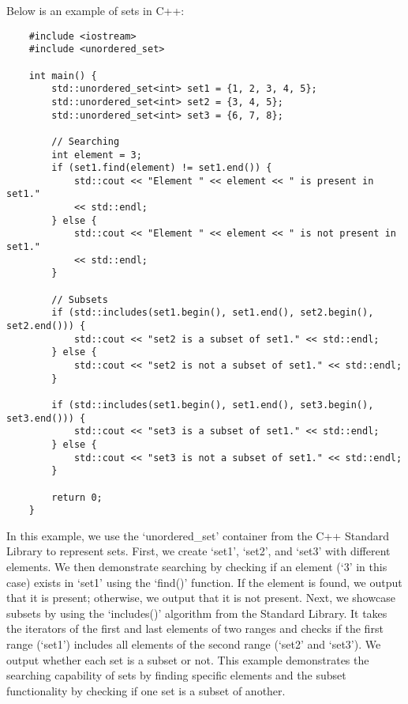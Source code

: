 \begin{solution}
    Below is an example of sets in C++:

    \horizontalline
    
    \begin{verbatim}
    #include <iostream>
    #include <unordered_set>
    
    int main() {
        std::unordered_set<int> set1 = {1, 2, 3, 4, 5};
        std::unordered_set<int> set2 = {3, 4, 5};
        std::unordered_set<int> set3 = {6, 7, 8};
    
        // Searching
        int element = 3;
        if (set1.find(element) != set1.end()) {
            std::cout << "Element " << element << " is present in set1." 
            << std::endl;
        } else {
            std::cout << "Element " << element << " is not present in set1." 
            << std::endl;
        }
    
        // Subsets
        if (std::includes(set1.begin(), set1.end(), set2.begin(), set2.end())) {
            std::cout << "set2 is a subset of set1." << std::endl;
        } else {
            std::cout << "set2 is not a subset of set1." << std::endl;
        }
    
        if (std::includes(set1.begin(), set1.end(), set3.begin(), set3.end())) {
            std::cout << "set3 is a subset of set1." << std::endl;
        } else {
            std::cout << "set3 is not a subset of set1." << std::endl;
        }
    
        return 0;
    }
    \end{verbatim}

    \horizontalline

    In this example, we use the `unordered\_set' container from the C++ Standard Library to represent sets. First, we create `set1', `set2', and `set3' with different elements. We then demonstrate searching by checking if an element (`3' in this case) exists in `set1' using the `find()' function. If the element is found, we output that it 
    is present; otherwise, we output that it is not present. Next, we showcase subsets by using the `includes()' algorithm from the Standard Library. It takes the iterators of the first and last elements of two ranges and checks if the first range (`set1') includes all elements of the second range (`set2' and `set3'). We output whether 
    each set is a subset or not. This example demonstrates the searching capability of sets by finding specific elements and the subset functionality by checking if one set is a subset of another.
\end{solution}

